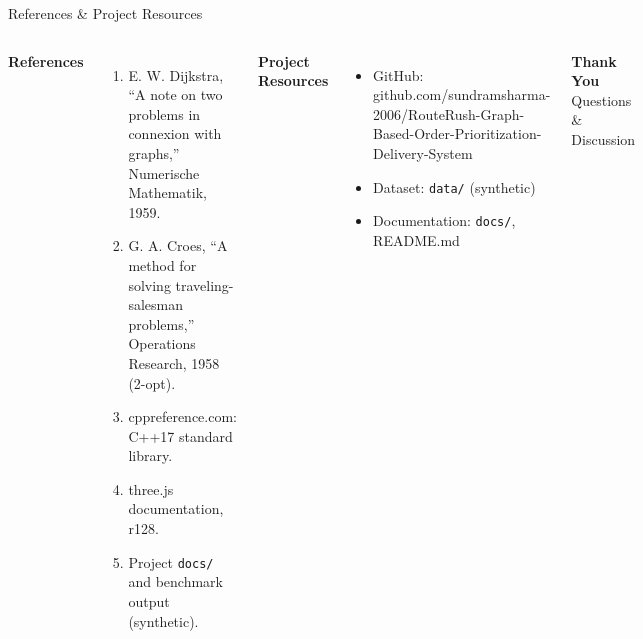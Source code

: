 \documentclass[aspectratio=169,11pt]{beamer}
\begin{document}
\begin{frame}{References \& Project Resources}
\footnotesize
\begin{columns}[T,totalwidth=\textwidth]
\textbf{\color{GEUBlue}References}
\begin{enumerate}\itemsep3pt
    \item E. W. Dijkstra, ``A note on two problems in connexion with graphs,'' Numerische Mathematik, 1959.
    \item G. A. Croes, ``A method for solving traveling-salesman problems,'' Operations Research, 1958 (2-opt).
    \item cppreference.com: C++17 standard library.
    \item three.js documentation, r128.
    \item Project \texttt{docs/} and benchmark output (synthetic).
\end{enumerate}
\textbf{\color{GEUBlue}Project Resources}
\begin{itemize}\itemsep3pt
    \item GitHub: github.com/sundramsharma-2006/RouteRush-Graph-Based-Order-Prioritization-Delivery-System
    \item Dataset: \texttt{data/} (synthetic)
    \item Documentation: \texttt{docs/}, README.md
\end{itemize}
\vfill
\begin{center}
\colorbox{GEUBlue}{\parbox{.82\textwidth}{\centering\color{white}\Large\textbf{Thank You}\\[1mm]\normalsize Questions \& Discussion}}
\end{center}
\end{columns}
\end{frame}
\end{document}

